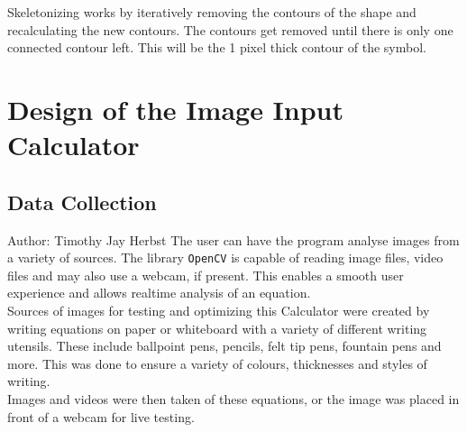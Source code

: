 \documentclass[11pt]{article}
\begin{document}
	Skeletonizing works by iteratively removing the contours of the shape and recalculating the new contours. The contours get removed until there is only one connected contour left. This will be the 1 pixel thick contour of the symbol.
	
	\section{Design of the Image Input Calculator}
	
	\subsection{Data Collection}
	\small{Author: Timothy Jay Herbst} \newline \newline
	The user can have the program analyse images from a variety of sources.
	The library \texttt{OpenCV} is capable of reading image files, video files and may also use a webcam, if present.
	This enables a smooth user experience and allows realtime analysis of an equation.\\
	Sources of images for testing and optimizing this Calculator were created by writing equations on paper or whiteboard with a variety of different writing utensils.
	These include ballpoint pens, pencils, felt tip pens, fountain pens and more.
	This was done to ensure a variety of colours, thicknesses and styles of writing.\\
	Images and videos were then taken of these equations, or the image was placed in front of a webcam for live testing.
	
	
\end{document}
